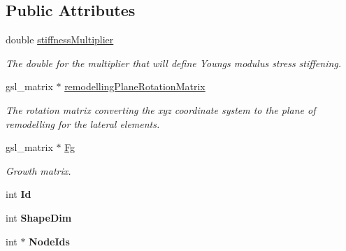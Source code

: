 \subsection*{Public Attributes}
\begin{DoxyCompactItemize}
\item 
\hypertarget{classShapeBase_a9cff4a8549b3399fec12309d18b6db70}{}double \hyperlink{classShapeBase_a9cff4a8549b3399fec12309d18b6db70}{stiffness\+Multiplier}\label{classShapeBase_a9cff4a8549b3399fec12309d18b6db70}

\begin{DoxyCompactList}\small\item\em The double for the multiplier that will define Young\textquotesingle{}s modulus stress stiffening. \end{DoxyCompactList}\item 
\hypertarget{classShapeBase_a0e8b443e4b55479a9d2a7a7eacd62b69}{}gsl\+\_\+matrix $\ast$ \hyperlink{classShapeBase_a0e8b443e4b55479a9d2a7a7eacd62b69}{remodelling\+Plane\+Rotation\+Matrix}\label{classShapeBase_a0e8b443e4b55479a9d2a7a7eacd62b69}

\begin{DoxyCompactList}\small\item\em The rotation matrix converting the xyz coordinate system to the plane of remodelling for the lateral elements. \end{DoxyCompactList}\item 
\hypertarget{classShapeBase_a4156d7c7f91f0b528214b74277279df0}{}gsl\+\_\+matrix $\ast$ \hyperlink{classShapeBase_a4156d7c7f91f0b528214b74277279df0}{Fg}\label{classShapeBase_a4156d7c7f91f0b528214b74277279df0}

\begin{DoxyCompactList}\small\item\em Growth matrix. \end{DoxyCompactList}\item 
\hypertarget{classShapeBase_ae097764dd4d607b54710d7ca0f7e12f8}{}int {\bfseries Id}\label{classShapeBase_ae097764dd4d607b54710d7ca0f7e12f8}

\item 
\hypertarget{classShapeBase_a4d740b60433d7a9104c2d09b0d52703d}{}int {\bfseries Shape\+Dim}\label{classShapeBase_a4d740b60433d7a9104c2d09b0d52703d}

\item 
\hypertarget{classShapeBase_a870e519202c84ef5a81fd35b059fdebe}{}int $\ast$ {\bfseries Node\+Ids}\label{classShapeBase_a870e519202c84ef5a81fd35b059fdebe}


\end{DoxyCompactItemize}
